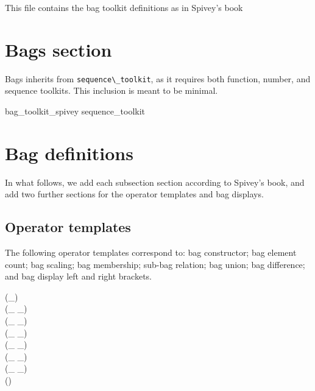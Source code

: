\documentclass{article}
\begin{document}
This file contains the bag toolkit definitions as in Spivey's book

\section{Bags section}

Bags inherits from \verb'sequence\_toolkit', as it requires
both function, number, and sequence toolkits. This inclusion
is meant to be minimal.
%
\begin{zsection}
\SECTION bag\_toolkit\_spivey \parents sequence\_toolkit
\end{zsection}

\section{Bag definitions}

In what follows, we add each subsection section
according to Spivey's book, and add two further
sections for the operator templates and bag displays.

\subsection{Operator templates}

The following operator templates correspond to:
bag constructor; bag element count; bag scaling;
bag membership; sub-bag relation; bag union;
bag difference; and bag display left and right brackets.




\begin{zed}
    \generic (\bag \_) \\
     \leftassoc (\_ \bcount \_) \\
     \leftassoc (\_ \otimes \_) \\
    \relation (\_ \inbag \_) \\
    \relation (\_ \subbageq \_) \\
     \leftassoc (\_ \uplus \_) \\
     \leftassoc (\_ \uminus \_) \\
    \function (\lbag \listarg \rbag) \\
\end{zed}
\end{document}
